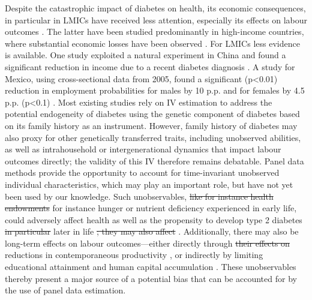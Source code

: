 \documentclass[12pt,english]{article}
\providecommand{\DIFaddtex}[1]{{\protect\color{blue}#1}} %
\providecommand{\DIFdeltex}[1]{{\protect\color{red}\sout{#1}}}                      %
\providecommand{\DIFaddbegin}{} %
\providecommand{\DIFaddend}{} %
\providecommand{\DIFdelbegin}{} %
\providecommand{\DIFdelend}{} %
\providecommand{\DIFadd}[1]{\texorpdfstring{\DIFaddtex{#1}}{#1}} %
\providecommand{\DIFdel}[1]{\texorpdfstring{\DIFdeltex{#1}}{}} %
\begin{document}
Despite the catastrophic impact of diabetes on health, its economic consequences, in particular in \acp{LMIC} have received less attention, especially its effects on labour outcomes \parencite{Anonymous2007}. The latter have been studied predominantly in high-income countries, where substantial economic losses have been observed \parencite{Brown2005,Brown2014,BrownIII2011,Minor2011,Minor2013,Minor2015,Latif2009}. For \acp{LMIC} less evidence is available. One study exploited a natural experiment in China and found a significant reduction in income due to a recent diabetes diagnosis \parencite{Liu2014}. A study for Mexico, using cross-sectional data from 2005, found a significant (p<0.01) reduction in employment probabilities for males by 10 \ac{p.p.} and for females by 4.5 \ac{p.p.} (p<0.1) \parencite{Anonymous2007}. Most existing studies rely on \ac{IV} estimation to address the potential endogeneity of diabetes using the genetic component of diabetes based on its family history as an instrument.  However, family history of diabetes may also proxy for other genetically transferred traits, including unobserved abilities, as well as  intrahousehold or intergenerational dynamics that impact labour outcomes directly; the validity of this \ac{IV} therefore remains debatable. Panel data methods provide the opportunity to account for time-invariant unobserved individual characteristics, which may play an important role, but have not yet been used by our knowledge. Such unobservables, \DIFdelbegin \DIFdel{like for instance health endowments }\DIFdelend \DIFaddbegin \DIFadd{for instance hunger or nutrient deficiency experienced in early life, }\DIFaddend could adversely affect health as well as the propensity to develop type 2 diabetes \DIFdelbegin \DIFdel{in particular }\DIFdelend \DIFaddbegin \DIFadd{later in life }\DIFaddend \parencite{VanEwijk2011,Sotomayor2013,Li2010b}\DIFdelbegin \DIFdel{; they may also affect }\DIFdelend \DIFaddbegin \DIFadd{. Additionally, there may also be long-term effects on }\DIFaddend labour outcomes---either directly through \DIFdelbegin \DIFdel{their effects on }\DIFdelend \DIFaddbegin \DIFadd{reductions in }\DIFaddend contemporaneous productivity \parencite{Currie2013}, or indirectly by limiting educational attainment and human capital accumulation \parencite{Ayyagari2011a}. These unobservables thereby present a major source of a potential bias that can be accounted for by the use of panel data estimation.
\end{document}
